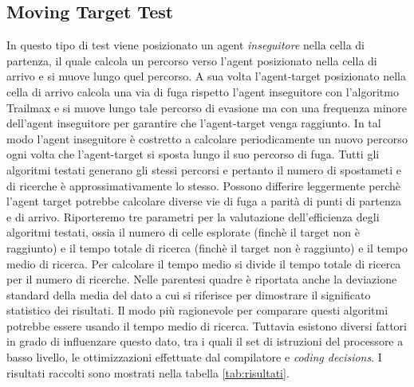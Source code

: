 \documentclass[12pt]{book}
\begin{document}
{\begin{table}[H]
{}

\end{table}

\fi
\subsection{Moving Target Test}
\par{In questo tipo di test viene posizionato un agent \emph{inseguitore} nella cella di partenza, il quale calcola un percorso verso l'agent posizionato nella cella di arrivo e si muove lungo quel percorso. A sua volta l'agent-target posizionato nella cella di arrivo calcola una via di fuga rispetto l'agent inseguitore con l'algoritmo Trailmax e si muove lungo tale percorso di evasione ma con una frequenza minore dell'agent inseguitore per garantire che l'agent-target venga raggiunto. In tal modo l'agent inseguitore \`e costretto a calcolare periodicamente un nuovo percorso ogni volta che l'agent-target si sposta lungo il suo percorso di fuga. Tutti gli algoritmi testati generano gli stessi percorsi e pertanto il numero di spostameti e di ricerche \`e approssimativamente lo stesso. Possono differire leggermente perch\`e l'agent target potrebbe calcolare diverse vie di fuga a parit\`a di punti di partenza e di arrivo. Riporteremo tre parametri per la valutazione dell'efficienza degli algoritmi testati, ossia il numero di celle esplorate (finch\`e il target non \`e raggiunto) e il tempo totale di ricerca (finch\`e il target non \`e raggiunto) e il tempo medio di ricerca. Per calcolare il tempo medio si divide il tempo totale di ricerca per il numero di ricerche. Nelle parentesi quadre \`e riportata anche la deviazione standard della media del dato a cui si riferisce per dimostrare il significato statistico dei risultati. Il modo pi\`u ragionevole per comparare questi algoritmi potrebbe essere usando il tempo medio di ricerca. Tuttavia esistono diversi fattori in grado di influenzare questo dato, tra i quali il set di istruzioni del processore a basso livello, le ottimizzazioni effettuate dal compilatore e \emph{coding decisions}. I risultati raccolti sono mostrati nella tabella \ref{tab:risultati}.}

\begin{table}[H]
\caption {Risultati Moving Target Test } \label{tab:risultati} 
\centering

\end{table}}
\end{document}
